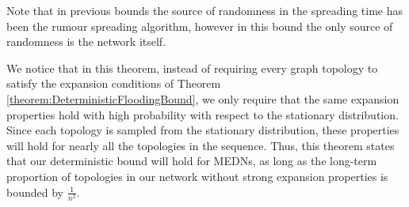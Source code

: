 Note that in previous bounds the source of randomness in the spreading time has been the rumour spreading algorithm, however in this bound the only source of randomness is the network itself.

We notice that in this theorem, instead of requiring every graph topology to satisfy the expansion conditions of Theorem \ref{theorem:DeterministicFloodingBound}, we only require that the same expansion properties hold with high probability with respect to the stationary distribution. %
Since each topology is sampled from the stationary distribution, these properties will hold for nearly all the topologies in the sequence. Thus, this theorem states that our deterministic bound will hold for MEDNs, as long as the long-term proportion of topologies in our network without strong expansion properties is bounded by $\frac{1}{n^2}$.


